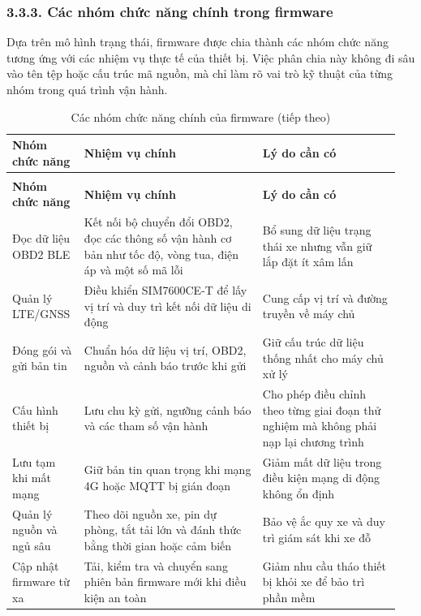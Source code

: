 \documentclass[a4paper]{extarticle}
\newcommand{\thesissettableid}[2]{%
  \renewcommand{\thetable}{#1}%
  \renewcommand{\theHtable}{#2}%
}
\begin{document}
\subsubsection{3.3.3. Các nhóm chức năng chính trong firmware}\label{cuxe1c-nhuxf3m-chux1ee9c-nux103ng-chuxednh-trong-firmware}

Dựa trên mô hình trạng thái, firmware được chia thành các nhóm chức năng tương
ứng với các nhiệm vụ thực tế của thiết bị. Việc phân chia này không đi sâu vào
tên tệp hoặc cấu trúc mã nguồn, mà chỉ làm rõ vai trò kỹ thuật của từng nhóm
trong quá trình vận hành.

{\thesissettableid{3.18}{condensed-bang-3-18-cac-nhom-chuc-nang-chinh-cua-firmware}
\def\LTcaptype{table}
\begin{longtable}{|L{0.170\linewidth}|L{0.440\linewidth}|L{0.340\linewidth}|}
\caption{Các nhóm chức năng chính của firmware}\label{tab:condensed-bang-3-18-cac-nhom-chuc-nang-chinh-cua-firmware}\\
\hline
\textbf{Nhóm chức năng} & \textbf{Nhiệm vụ chính} & \textbf{Lý do cần có} \\
\hline
\endfirsthead
\caption[]{Các nhóm chức năng chính của firmware (tiếp theo)}\\
\hline
\textbf{Nhóm chức năng} & \textbf{Nhiệm vụ chính} & \textbf{Lý do cần có} \\
\hline
\endhead
\endfoot
\endlastfoot
Đọc dữ liệu OBD2 BLE & Kết nối bộ chuyển đổi OBD2, đọc các thông số vận hành cơ bản như tốc độ, vòng tua, điện áp và một số mã lỗi & Bổ sung dữ liệu trạng thái xe nhưng vẫn giữ lắp đặt ít xâm lấn \\\hline
Quản lý LTE/GNSS & Điều khiển SIM7600CE-T để lấy vị trí và duy trì kết nối dữ liệu di động & Cung cấp vị trí và đường truyền về máy chủ \\\hline
Đóng gói và gửi bản tin & Chuẩn hóa dữ liệu vị trí, OBD2, nguồn và cảnh báo trước khi gửi & Giữ cấu trúc dữ liệu thống nhất cho máy chủ xử lý \\\hline
Cấu hình thiết bị & Lưu chu kỳ gửi, ngưỡng cảnh báo và các tham số vận hành & Cho phép điều chỉnh theo từng giai đoạn thử nghiệm mà không phải nạp lại chương trình \\\hline
Lưu tạm khi mất mạng & Giữ bản tin quan trọng khi mạng 4G hoặc MQTT bị gián đoạn & Giảm mất dữ liệu trong điều kiện mạng di động không ổn định \\\hline
Quản lý nguồn và ngủ sâu & Theo dõi nguồn xe, pin dự phòng, tắt tải lớn và đánh thức bằng thời gian hoặc cảm biến & Bảo vệ ắc quy xe và duy trì giám sát khi xe đỗ \\\hline
Cập nhật firmware từ xa & Tải, kiểm tra và chuyển sang phiên bản firmware mới khi điều kiện an toàn & Giảm nhu cầu tháo thiết bị khỏi xe để bảo trì phần mềm \\\hline
\end{longtable}
}
\end{document}
